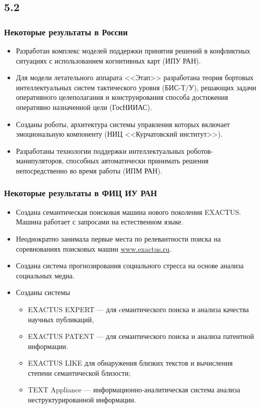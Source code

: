 \documentclass[default]{beamer}
\begin{document}
	\subsection{5.2}
	\begin{frame}
		\frametitle{Некоторые результаты в России}

		\begin{itemize}
			\item Разработан комплекс моделей поддержки принятия решений в конфликтных ситуациях с использованием когнитивных карт (ИПУ РАН). 
			\item Для модели летательного аппарата <<Этап>>	разработана теория бортовых 	интеллектуальных систем тактического уровня (БИС-Т/У), решающих задачи оперативного целеполагания и конструирования способа достижения оперативно назначенной цели (ГосНИИАС).
			\item Созданы роботы, архитектура системы управления которых включает эмоциональную компоненту (НИЦ <<Курчатовский институт>>). 
			\item Разработаны технологии поддержки интеллектуальных роботов-манипуляторов, способных автоматически принимать решения непосредственно во время работы (ИПМ РАН).
		\end{itemize}
	\end{frame}

	\begin{frame}
		\frametitle{Некоторые результаты в ФИЦ ИУ РАН}
		
		\begin{itemize}
			\item Создана семантическая поисковая машина нового поколения EXACTUS.  Машина работает с запросами на естественном языке.
			\item Неоднократно занимала первые места по релевантности поиска на соревнованиях поисковых 	машин \href{www.exactus.ru}{www.exactus.ru}.
			\item Создана система прогнозирования социального стресса на основе анализа социальных медиа.
			\item Созданы системы
			\begin{itemize}
				\item EXACTUS EXPERT --- для cемантического поиска и анализа качества научных публикаций,
				\item EXACTUS PATENT --- для семантического поиска и анализа патентной информации.
				\item EXACTUS LIKE для обнаружения близких текстов и вычисления степени семантической близости;
				\item TEXT Appliance --- информационно-аналитическая система анализа неструктурированной информации.
			\end{itemize}
		\end{itemize}
	\end{frame}
\end{document}
